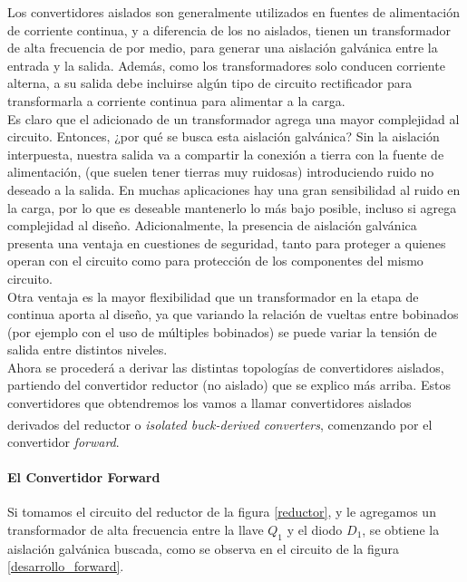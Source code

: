 Los convertidores aislados son generalmente utilizados en fuentes de alimentación de corriente continua, y a diferencia de los no aislados, tienen un transformador de alta frecuencia de por medio, para generar una {\Medium aislación galvánica entre la entrada y la salida}. Además, como los transformadores solo conducen corriente alterna, a su salida debe incluirse algún tipo de circuito rectificador para transformarla a corriente continua para alimentar a la carga.\\

Es claro que el adicionado de un transformador agrega una mayor complejidad al circuito. Entonces, ¿por qué se busca esta aislación galvánica? Sin la aislación interpuesta, nuestra salida va a compartir la conexión a tierra con la fuente de alimentación, (que suelen tener tierras muy ruidosas) introduciendo ruido no deseado a la salida. En muchas aplicaciones hay una gran sensibilidad al ruido en la carga, por lo que es deseable mantenerlo lo más bajo posible, incluso si agrega complejidad al diseño. Adicionalmente, la presencia de aislación galvánica presenta una ventaja en cuestiones de seguridad, tanto para proteger a quienes operan con el circuito como para protección de los componentes del mismo circuito.\\

Otra ventaja es la mayor flexibilidad que un transformador en la etapa de continua aporta al diseño, ya que variando la relación de vueltas entre bobinados (por ejemplo con el uso de múltiples bobinados) se puede variar la tensión de salida entre distintos niveles.\\

Ahora se procederá a derivar las distintas topologías de convertidores aislados, partiendo del convertidor reductor (no aislado) que se explico más arriba. Estos convertidores que obtendremos los vamos a llamar {\Medium convertidores aislados derivados del reductor} o \textit{isolated buck-derived converters}\textsuperscript{\cite{SoftSwitchPWM}}, comenzando por el convertidor \textit{forward}.\\

\paragraph{El Convertidor Forward}

Si tomamos el circuito del reductor de la figura \ref{reductor}, y le agregamos un transformador de alta frecuencia entre la llave $Q_1$ y el diodo $D_1$, se obtiene la aislación galvánica buscada, como se observa en el circuito de la figura \ref{desarrollo_forward}.\\

